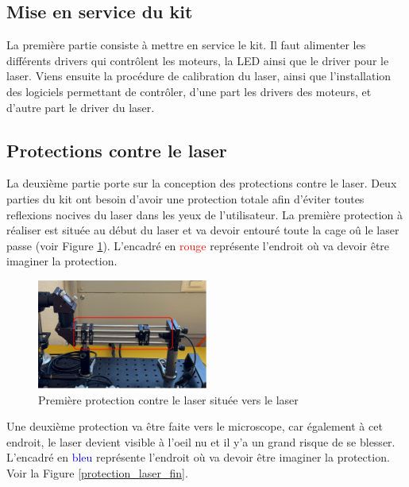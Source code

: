 \subsection{Mise en service du kit}

La première partie consiste à mettre en service le kit. Il faut alimenter les différents drivers qui contrôlent les moteurs, la LED ainsi que le driver pour le laser. Viens ensuite la procédure de calibration du laser, ainsi que l'installation des logiciels permettant de contrôler, d'une part les drivers des moteurs, et d'autre part le driver du laser.
\subsection{Protections contre le laser}
La deuxième partie porte sur la conception des protections contre le laser. Deux parties du kit ont besoin d'avoir une protection totale afin d'éviter toutes reflexions nocives du laser dans les yeux de l'utilisateur. La première protection à réaliser est située au début du laser et va devoir entouré toute la cage oû le laser passe (voir Figure \ref{protection_laser_début}). L'encadré en \textcolor{red}{rouge} représente l'endroit où va devoir être imaginer la protection.

\begin{figure}[H]
    \begin{center}
        \includegraphics[width=0.5\textwidth]{assets/figures/Introduction/protection_debut_laser.png}
    \end{center}
    \caption{Première protection contre le laser située vers le laser}
    \label{protection_laser_début}
\end{figure}

Une deuxième protection va être faite vers le microscope, car également à cet endroit, le laser devient visible à l'oeil nu et il y'a un grand risque de se blesser. L'encadré en \textcolor{blue}{bleu} représente l'endroit où va devoir être imaginer la protection. Voir la Figure \ref{protection_laser_fin}.

